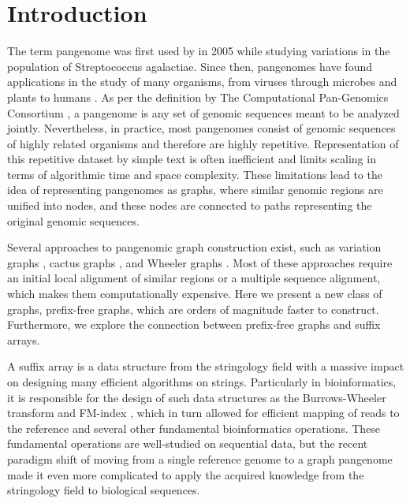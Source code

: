 \section{Introduction}
The term pangenome was first used by \citet{tettelin2005genome} in 2005 while studying variations in the population of Streptococcus agalactiae.
Since then, pangenomes have found applications in the study of many organisms, from viruses \cite{lau2021profiling} through microbes \cite{dutilh2014comparative} and plants \cite{danilevicz2020plant} to humans \cite{wang2022human}.
As per the definition by The Computational Pan-Genomics Consortium \cite{computational2018computational}, a pangenome is any set of genomic sequences meant to be analyzed jointly.
Nevertheless, in practice, most pangenomes consist of genomic sequences of highly related organisms and therefore are highly repetitive.
Representation of this repetitive dataset by simple text is often inefficient and limits scaling in terms of algorithmic time and space complexity.
These limitations lead to the idea of representing pangenomes as graphs, where similar genomic regions are unified into nodes, and these nodes are connected to paths representing the original genomic sequences.

Several approaches to pangenomic graph construction exist, such as variation graphs \cite{church2015extending,garrison2018variation,garrison2023building}, cactus graphs \cite{paten2011cactus,hickey2023pangenome}, and Wheeler graphs \cite{gagie2017wheeler,2022pfwg}.
Most of these approaches require an initial local alignment of similar regions or a multiple sequence alignment, which makes them computationally expensive.
Here we present a new class of graphs, prefix-free graphs, which are orders of magnitude faster to construct.
Furthermore, we explore the connection between prefix-free graphs and suffix arrays.

A suffix array is a data structure from the stringology field with a massive impact on designing many efficient algorithms on strings.
Particularly in bioinformatics, it is responsible for the design of such data structures as the Burrows-Wheeler transform \cite{burrows1994block} and FM-index \cite{ferragina2000opportunistic}, which in turn allowed for efficient mapping of reads to the reference and several other fundamental bioinformatics operations.
These fundamental operations are well-studied on sequential data, but the recent paradigm shift of moving from a single reference genome to a graph pangenome made it even more complicated to apply the acquired knowledge from the stringology field to biological sequences.

